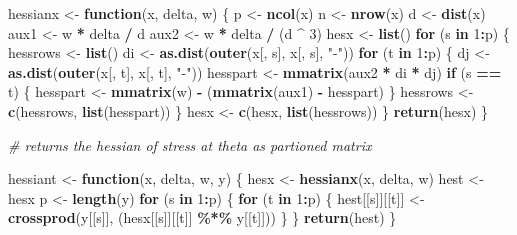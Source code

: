 \documentclass[
  12pt,
]{article}
\newenvironment{Shaded}{\begin{snugshade}}{\end{snugshade}}
\newcommand{\CommentTok}[1]{\textcolor[rgb]{0.56,0.35,0.01}{\textit{#1}}}
\newcommand{\ControlFlowTok}[1]{\textcolor[rgb]{0.13,0.29,0.53}{\textbf{#1}}}
\newcommand{\DecValTok}[1]{\textcolor[rgb]{0.00,0.00,0.81}{#1}}
\newcommand{\FunctionTok}[1]{\textcolor[rgb]{0.13,0.29,0.53}{\textbf{#1}}}
\newcommand{\NormalTok}[1]{#1}
\newcommand{\OtherTok}[1]{\textcolor[rgb]{0.56,0.35,0.01}{#1}}
\newcommand{\SpecialCharTok}[1]{\textcolor[rgb]{0.81,0.36,0.00}{\textbf{#1}}}
\newcommand{\StringTok}[1]{\textcolor[rgb]{0.31,0.60,0.02}{#1}}
\begin{document}
\begin{Shaded}
\begin{Highlighting}[]
\NormalTok{hessianx }\OtherTok{\textless{}{-}} \ControlFlowTok{function}\NormalTok{(x, delta, w) \{}
\NormalTok{  p }\OtherTok{\textless{}{-}} \FunctionTok{ncol}\NormalTok{(x)}
\NormalTok{  n }\OtherTok{\textless{}{-}} \FunctionTok{nrow}\NormalTok{(x)}
\NormalTok{  d }\OtherTok{\textless{}{-}} \FunctionTok{dist}\NormalTok{(x)}
\NormalTok{  aux1 }\OtherTok{\textless{}{-}}\NormalTok{ w }\SpecialCharTok{*}\NormalTok{ delta }\SpecialCharTok{/}\NormalTok{ d}
\NormalTok{  aux2 }\OtherTok{\textless{}{-}}\NormalTok{ w }\SpecialCharTok{*}\NormalTok{ delta }\SpecialCharTok{/}\NormalTok{ (d }\SpecialCharTok{\^{}} \DecValTok{3}\NormalTok{)}
\NormalTok{  hesx }\OtherTok{\textless{}{-}} \FunctionTok{list}\NormalTok{()}
  \ControlFlowTok{for}\NormalTok{ (s }\ControlFlowTok{in} \DecValTok{1}\SpecialCharTok{:}\NormalTok{p) \{}
\NormalTok{    hessrows }\OtherTok{\textless{}{-}} \FunctionTok{list}\NormalTok{()}
\NormalTok{    di }\OtherTok{\textless{}{-}} \FunctionTok{as.dist}\NormalTok{(}\FunctionTok{outer}\NormalTok{(x[, s], x[, s], }\StringTok{"{-}"}\NormalTok{))}
    \ControlFlowTok{for}\NormalTok{ (t }\ControlFlowTok{in} \DecValTok{1}\SpecialCharTok{:}\NormalTok{p) \{}
\NormalTok{      dj }\OtherTok{\textless{}{-}} \FunctionTok{as.dist}\NormalTok{(}\FunctionTok{outer}\NormalTok{(x[, t], x[, t], }\StringTok{"{-}"}\NormalTok{))}
\NormalTok{      hesspart }\OtherTok{\textless{}{-}} \FunctionTok{mmatrix}\NormalTok{(aux2 }\SpecialCharTok{*}\NormalTok{ di }\SpecialCharTok{*}\NormalTok{ dj)}
      \ControlFlowTok{if}\NormalTok{ (s }\SpecialCharTok{==}\NormalTok{ t) \{}
\NormalTok{        hesspart }\OtherTok{\textless{}{-}} \FunctionTok{mmatrix}\NormalTok{(w) }\SpecialCharTok{{-}}\NormalTok{ (}\FunctionTok{mmatrix}\NormalTok{(aux1) }\SpecialCharTok{{-}}\NormalTok{ hesspart)}
\NormalTok{      \}}
\NormalTok{      hessrows }\OtherTok{\textless{}{-}} \FunctionTok{c}\NormalTok{(hessrows, }\FunctionTok{list}\NormalTok{(hesspart))}
\NormalTok{    \}}
\NormalTok{    hesx }\OtherTok{\textless{}{-}} \FunctionTok{c}\NormalTok{(hesx, }\FunctionTok{list}\NormalTok{(hessrows))}
\NormalTok{  \}}
  \FunctionTok{return}\NormalTok{(hesx)}
\NormalTok{\}}

\CommentTok{\# returns the hessian of stress at theta as partioned matrix}

\NormalTok{hessiant }\OtherTok{\textless{}{-}} \ControlFlowTok{function}\NormalTok{(x, delta, w, y) \{}
\NormalTok{  hesx }\OtherTok{\textless{}{-}} \FunctionTok{hessianx}\NormalTok{(x, delta, w)}
\NormalTok{  hest }\OtherTok{\textless{}{-}}\NormalTok{ hesx}
\NormalTok{  p }\OtherTok{\textless{}{-}} \FunctionTok{length}\NormalTok{(y)}
  \ControlFlowTok{for}\NormalTok{ (s }\ControlFlowTok{in} \DecValTok{1}\SpecialCharTok{:}\NormalTok{p) \{}
    \ControlFlowTok{for}\NormalTok{ (t }\ControlFlowTok{in} \DecValTok{1}\SpecialCharTok{:}\NormalTok{p) \{}
\NormalTok{      hest[[s]][[t]] }\OtherTok{\textless{}{-}} \FunctionTok{crossprod}\NormalTok{(y[[s]], (hesx[[s]][[t]] }\SpecialCharTok{\%*\%}\NormalTok{ y[[t]]))}
\NormalTok{    \}}
\NormalTok{  \}}
  \FunctionTok{return}\NormalTok{(hest)}
\NormalTok{\}}



\end{Highlighting}
\end{Shaded}
\end{document}
